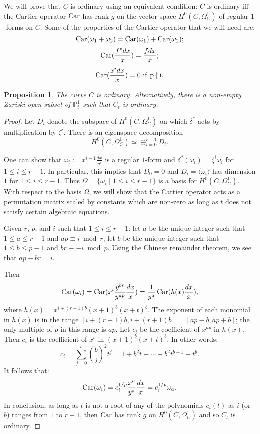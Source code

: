 \documentclass[reqno]{amsart}
\newtheorem{proposition}[thm]{Proposition}
\theoremstyle{definition}
\theoremstyle{remark}
\def \PP {{\mathbb P}^1}
\def \car {\mathop {\rm Car}}
\begin{document}
We will prove that $C$ is ordinary using an equivalent condition:
$C$ is ordinary iff the Cartier operator $\car$ has rank $g$ on the vector space $H^0(C, \Omega^1_C)$ of regular $1$-forms on $C$.
Some of the properties of the Cartier operator that we will need are:
\[\car(\omega_1 + \omega_2)=\car(\omega_1) + \car(\omega_2);\]
\[\car(\frac{f^p dx}{x})=\frac{f dx}{x};\]
\[\car(\frac{x^i dx}{x})=0 \ {\rm if \ p \nmid i}.\] 

\begin{proposition}
The curve $C$ is ordinary.  Alternatively, 
there is a non-empty Zariski open subset of $\PP_t$ such that $C_t$ is ordinary.
\end{proposition}

\begin{proof}
Let $D_i$ denote the subspace of $H^0(C, \Omega^1_C)$ on which $\delta^*$ acts by multiplication by $\zeta^i$.
There is an eigenspace decomposition
\[H^0(C, \Omega^1_C) \simeq \oplus_{i=0}^{r-1} D_i.\]

One can show that $\omega_i:=x^{i-1}\frac{dx}{y^i}$ is a regular $1$-form and $\delta^*(\omega_i)=\zeta^i \omega_i$ for $1 \leq i \leq r-1$.
In particular, this implies that $D_0=0$ and $D_i = \langle \omega_i \rangle$ has dimension $1$ for $1 \leq i \leq r-1$.
Thus $\Omega=\{\omega_i \mid 1 \leq i \leq r-1\}$ is a basis for $H^0(C, \Omega^1_C)$.
With respect to the basis $\Omega$, we will show that the Cartier operator acts as a permutation matrix scaled by constants which are non-zero 
as long as $t$ does not satisfy certain algebraic equations.

Given $r$, $p$, and $i$ such that $1 \leq i \leq r-1$: 
let $a$ be the unique integer such that $1 \leq a \leq r-1$ and $ap \equiv i \bmod r$;
let $b$ be the unique integer such that $1 \leq b \leq p-1$ and $br \equiv -i \bmod p$.
Using the Chinese remainder theorem, we see that $ap-br=i$.

Then 
\[\car(\omega_i)=\car(x^i \frac{y^{br}}{y^{ap}}\frac{dx}{x})=\frac{1}{y^a}\car(h(x) \frac{dx}{x}),\]
where $h(x)=x^{i+(r-1)b}(x+1)^b(x+t)^b$.
The exponent of each monomial in $h(x)$ is in the range $[i+(r-1)b, i+(r+1)b]=[ap-b, ap+b]$; the only multiple of $p$ in this range is $ap$.
Let $c_i$ be the coefficient of $x^{ap}$ in $h(x)$.
Then $c_i$ is the coefficient of $x^b$ in $(x+1)^b(x+t)^b$.
In other words:
\[c_i=\sum_{j=0}^b {b \choose j}^2 t^j  = 1 + b^2 t + \cdots + b^2t^{b-1} + t^b.\]
It follows that: 
\[\car(\omega_i)=c_i^{1/p} \frac{x^a}{y^a} \frac{dx}{x}= c_i^{1/p} \omega_a.\]
In conclusion, as long as $t$ is not a root of any of the polynomials $c_i(t)$ as $i$ (or $b$) ranges from $1$ to $r-1$, then $\car$ has rank $g$ on $H^0(C, \Omega^1_C)$
and so $C_t$ is ordinary.
\end{proof}
\end{document}
